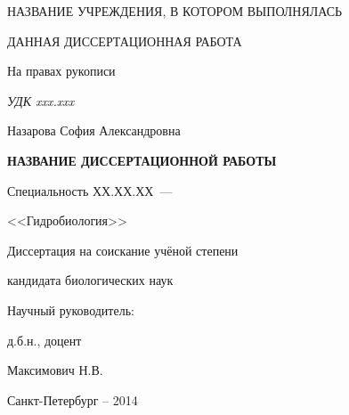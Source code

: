 \thispagestyle{empty}

\begin{center}
НАЗВАНИЕ УЧРЕЖДЕНИЯ, В КОТОРОМ ВЫПОЛНЯЛАСЬ\par
ДАННАЯ ДИССЕРТАЦИОННАЯ РАБОТА\par 
\par
\end{center}

\vspace{20mm}
\begin{flushright}
На правах рукописи

{\sl УДК xxx.xxx}
\end{flushright}

\vspace{30mm}
\begin{center}
{\large Назарова София Александровна}
\end{center}

\vspace{5mm}
\begin{center}
{\bf \large НАЗВАНИЕ ДИССЕРТАЦИОННОЙ РАБОТЫ
\par}

\vspace{10mm}
{%
Специальность ХХ.ХХ.ХХ~---

<<Гидробиология>>
}

\vspace{10mm}
Диссертация на соискание учёной степени

кандидата биологических наук
\end{center}

\vspace{20mm}
\begin{flushright}
Научный руководитель:

д.б.н., доцент

Максимович Н.В.

\end{flushright}

\vspace{20mm}
\begin{center}
{Санкт-Петербург  -- 2014}
\end{center}

\newpage
